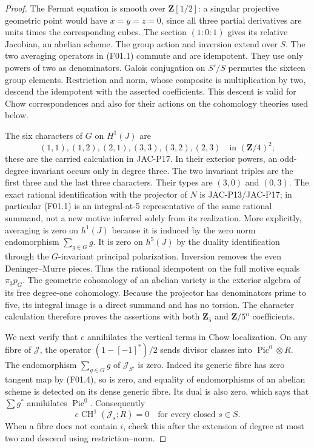 \begin{proof}
The Fermat equation is smooth over $\mathbf Z[1/2]$: a singular
projective geometric point would have $x=y=z=0$, since all three
partial derivatives are units times the corresponding cubes.
The section $(1:0:1)$ gives its relative Jacobian, an abelian scheme.
The group action and inversion extend over $S$.  The two averaging
operators in (F01.1) commute and are idempotent.  They use only
powers of two as denominators.  Galois conjugation on $S'/S$ permutes
the sixteen group elements.  Restriction and norm, whose composite
is multiplication by two, descend the idempotent with the asserted
coefficients.  This descent is valid for Chow correspondences and
also for their actions on the cohomology theories used below.

The six characters of $G$ on $H^1(J)$ are
\[
 (1,1),(1,2),(2,1),(3,3),(3,2),(2,3)\quad\text{in }(\mathbf Z/4)^2;
 \tag{F01.4}
\]
these are the carried calculation in JAC-P17.  In their exterior
powers, an odd-degree invariant occurs only in degree three.  The
two invariant triples are the first three and the last three
characters.  Their types are $(3,0)$ and $(0,3)$.  The exact rational
identification with the projector of $N$ is JAC-P13/JAC-P17; in
particular (F01.1) is an integral-at-5 representative of the same
rational summand, not a new motive inferred solely from its
realization.  More explicitly, averaging is zero on $h^1(J)$
because it is induced by the zero norm endomorphism
$\sum_{g\in G}g$.  It is zero on $h^5(J)$ by the duality
identification through the $G$-invariant principal polarization.
Inversion removes the even Deninger--Murre pieces.  Thus the
rational idempotent on the full motive equals $\pi_3p_G$.
The geometric cohomology of an abelian variety is the
exterior algebra of its free degree-one cohomology.  Because the
projector has denominators prime to five, its integral image is a
direct summand and has no torsion.  The character calculation
therefore proves the assertions with both $\mathbf Z_5$ and
$\mathbf Z/5^n$ coefficients.

We next verify that $e$ annihilates the vertical terms in Chow
localization.  On any fibre of $\mathcal J$, the operator
$(1-[-1]^*)/2$ sends divisor classes into
$\operatorname{Pic}^0\otimes R$.  The endomorphism
$\sum_{g\in G}g$ of $\mathcal J_{S'}$ is zero.  Indeed its generic
fibre has zero tangent map by (F01.4), so is zero, and equality of
endomorphisms of an abelian scheme is detected on its dense generic
fibre.  Its dual is also zero, which says that
$\sum g^*$ annihilates $\operatorname{Pic}^0$.  Consequently
\[
 e\operatorname{CH}^1(\mathcal J_s;R)=0
 \quad\text{for every closed }s\in S.            \tag{F01.5}
\]
When a fibre does not contain $i$, check this after the extension
of degree at most two and descend using restriction--norm.


\end{proof}

